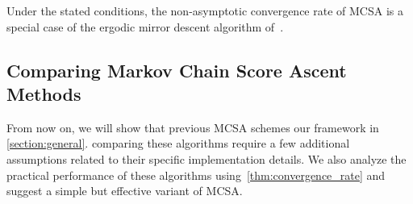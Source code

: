 Under the stated conditions, the non-asymptotic convergence rate of MCSA is a special case of the ergodic mirror descent algorithm of~\citet{duchi_ergodic_2012}.




\subsection{Comparing Markov Chain Score Ascent Methods}\label{section:comparison}
From now on, we will show that previous MCSA schemes our framework in \cref{section:general}.
comparing these algorithms require a few additional assumptions related to their specific implementation details.
We also analyze the practical performance of these algorithms using~\cref{thm:convergence_rate} and suggest a simple but effective variant of MCSA.

